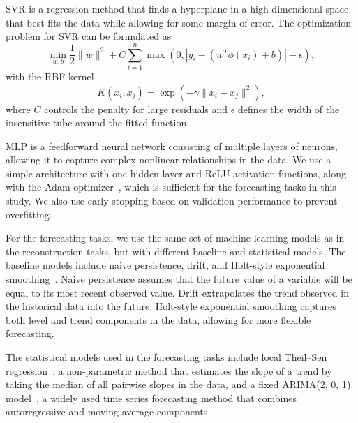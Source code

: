 SVR is a regression method that finds a hyperplane in a high-dimensional space that best fits the data while allowing for some margin of error. The optimization problem for SVR can be formulated as
\begin{equation}
	\min_{w, b} \frac{1}{2} \| w \|^2 + C \sum_{i=1}^n \max(0, |y_i - (w^T \phi(x_i) + b)| - \epsilon),
\end{equation}
with the RBF kernel
\begin{equation}
	K(x_i, x_j) = \exp \left( -\gamma \| x_i - x_j \|^2 \right),
\end{equation}
where \(C\) controls the penalty for large residuals and \(\epsilon\) defines the width of the insensitive tube around the fitted function.

MLP is a feedforward neural network consisting of multiple layers of neurons, allowing it to capture complex nonlinear relationships in the data. We use a simple architecture with one hidden layer and ReLU activation functions, along with the Adam optimizer~\cite{kingma2014adam}, which is sufficient for the forecasting tasks in this study. We also use early stopping based on validation performance to prevent overfitting.

For the forecasting tasks, we use the same set of machine learning models as in the reconstruction tasks, but with different baseline and statistical models. The baseline models include naive persistence, drift, and Holt-style exponential smoothing~\cite{holt2004forecasting}. Naive persistence assumes that the future value of a variable will be equal to its most recent observed value. Drift extrapolates the trend observed in the historical data into the future. Holt-style exponential smoothing captures both level and trend components in the data, allowing for more flexible forecasting.

The statistical models used in the forecasting tasks include local Theil--Sen regression~\cite{sen1968estimates}, a non-parametric method that estimates the slope of a trend by taking the median of all pairwise slopes in the data, and a fixed ARIMA(2, 0, 1) model~\cite{box2015time}, a widely used time series forecasting method that combines autoregressive and moving average components.
